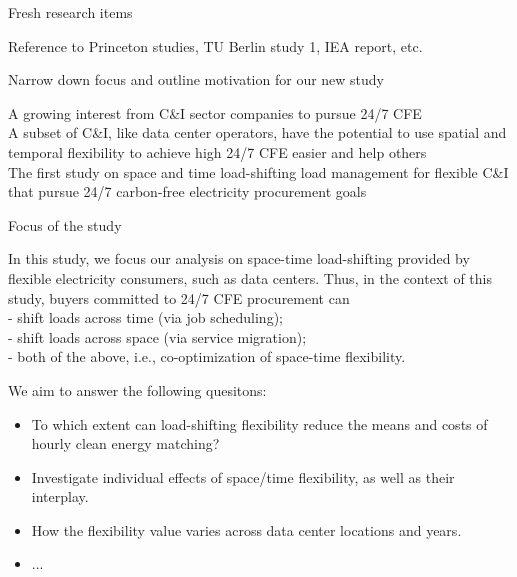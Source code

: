 \begin{frame}{Fresh research items}

  Reference to Princeton studies, TU Berlin study 1, IEA report, etc.

\end{frame}


\begin{frame}{Narrow down focus and outline motivation for our new study}

A growing interest from C\&I sector companies to pursue 24/7 CFE \\
A subset of C\&I, like data center operators, have the potential to use spatial and temporal flexibility to achieve high 24/7 CFE easier and help others \\
The first study on space and time load-shifting load management for flexible C\&I that pursue 24/7 carbon-free electricity procurement goals \\

\end{frame}

\begin{frame}{Focus of the study}

  In this study, we focus our analysis on \alert{space-time load-shifting} provided by flexible electricity consumers, such as data centers.
  Thus, in the context of this study, buyers committed to 24/7 CFE procurement can \\
  - shift loads across \alert{time} (via job scheduling); \\
  - shift loads across \alert{space} (via service migration); \\
  - both of the above, i.e., co-optimization of space-time flexibility.

  \vspace{0.3cm}
  We aim to answer the following quesitons:
  \begin{itemize}
    \item To which extent can load-shifting flexibility reduce the \alert{means and costs} of hourly clean energy matching?\\ 
    \item Investigate \alert{individual effects} of space/time flexibility, as well as their \alert{interplay}.\\
    \item How the flexibility value varies across data center \alert{locations} and \alert{years}.\\
    \item ...
  \end{itemize}

\end{frame}


